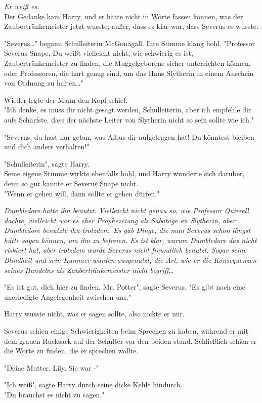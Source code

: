 {\emph{Er weiß es.}\\ Der Gedanke kam Harry, und er hätte nicht in Worte fassen können, was der Zaubertränkemeister jetzt wusste; außer, dass es klar war, dass Severus es wusste.

"Severus…" begann Schulleiterin McGonagall. Ihre Stimme klang hohl. "Professor Severus Snape, Du weißt vielleicht nicht, wie schwierig es ist, Zaubertränkemeister zu finden, die Muggelgeborene sicher unterrichten können, oder Professoren, die hart genug sind, um das Haus Slytherin in einem Anschein von Ordnung zu halten…"

Wieder legte der Mann den Kopf schief.\\ "Ich denke, es muss dir nicht gesagt werden, Schulleiterin, aber ich empfehle dir aufs Schärfste, dass der nächste Leiter von Slytherin nicht so sein sollte wie ich."

"Severus, du hast nur getan, was Albus dir aufgetragen hat! Du könntest bleiben und dich anders verhalten!"

"Schulleiterin", sagte Harry.\\ Seine eigene Stimme wirkte ebenfalls hohl, und Harry wunderte sich darüber, denn so gut kannte er Severus Snape nicht.\\ "Wenn er gehen will, dann sollte er gehen dürfen."

\emph{Dumbledore hatte ihn benutzt. Vielleicht nicht genau so, wie Professor Quirrell dachte, vielleicht war es eher Prophezeiung als Sabotage an Slytherin, aber Dumbledore benutzte ihn trotzdem. Es gab Dinge, die man Severus schon längst hätte sagen können, um ihn zu befreien. Es ist klar, warum Dumbledore das nicht riskiert hat, aber trotzdem wurde Severus nicht freundlich benutzt. Sogar seine Blindheit und sein Kummer wurden ausgenutzt, die Art, wie er die Konsequenzen seines Handelns als Zaubertränkemeister nicht begriff…}

"Es ist gut, dich hier zu finden, Mr. Potter", sagte Severus. "Es gibt noch eine unerledigte Angelegenheit zwischen uns."

Harry wusste nicht, was er sagen sollte, also nickte er nur.

Severus schien einige Schwierigkeiten beim Sprechen zu haben, während er mit dem grauen Rucksack auf der Schulter vor den beiden stand. Schließlich schien er die Worte zu finden, die er sprechen wollte.

"Deine Mutter. Lily. Sie war -"

"Ich weiß", sagte Harry durch seine dicke Kehle hindurch.\\ "Du brauchst es nicht zu sagen."

}
